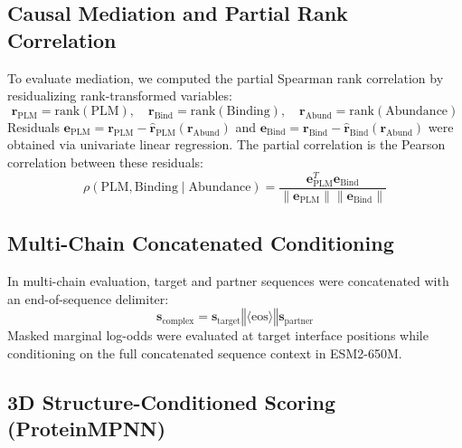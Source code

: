 \documentclass[
  11pt,
  us-letterpaper,
  DIV=11,
  numbers=noendperiod]{scrartcl}
\begin{document}
\subsection{Causal Mediation and Partial Rank
Correlation}\label{causal-mediation-and-partial-rank-correlation}

To evaluate mediation, we computed the partial Spearman rank correlation
by residualizing rank-transformed variables:
\[\mathbf{r}_{\text{PLM}} = \text{rank}(\text{PLM}), \quad \mathbf{r}_{\text{Bind}} = \text{rank}(\text{Binding}), \quad \mathbf{r}_{\text{Abund}} = \text{rank}(\text{Abundance})\]
Residuals
\(\mathbf{e}_{\text{PLM}} = \mathbf{r}_{\text{PLM}} - \hat{\mathbf{r}}_{\text{PLM}}(\mathbf{r}_{\text{Abund}})\)
and
\(\mathbf{e}_{\text{Bind}} = \mathbf{r}_{\text{Bind}} - \hat{\mathbf{r}}_{\text{Bind}}(\mathbf{r}_{\text{Abund}})\)
were obtained via univariate linear regression. The partial correlation
is the Pearson correlation between these residuals:
\[\rho(\text{PLM}, \text{Binding} \mid \text{Abundance}) = \frac{\mathbf{e}_{\text{PLM}}^T \mathbf{e}_{\text{Bind}}}{\|\mathbf{e}_{\text{PLM}}\| \|\mathbf{e}_{\text{Bind}}\|}\]

\subsection{Multi-Chain Concatenated
Conditioning}\label{multi-chain-concatenated-conditioning}

In multi-chain evaluation, target and partner sequences were
concatenated with an end-of-sequence delimiter:
\[\mathbf{s}_{\text{complex}} = \mathbf{s}_{\text{target}} \mathbin{\Vert} \langle\text{eos}\rangle \mathbin{\Vert} \mathbf{s}_{\text{partner}}\]
Masked marginal log-odds were evaluated at target interface positions
while conditioning on the full concatenated sequence context in
ESM2-650M.

\subsection{3D Structure-Conditioned Scoring
(ProteinMPNN)}\label{d-structure-conditioned-scoring-proteinmpnn}
\end{document}
